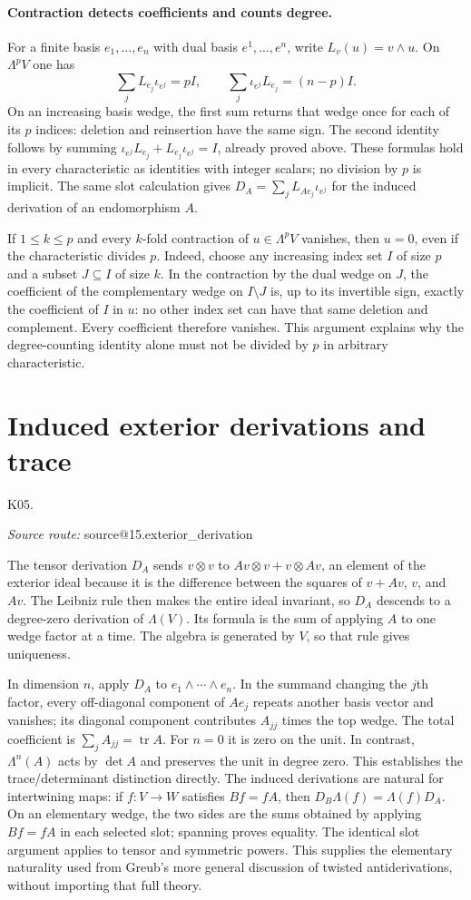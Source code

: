 \documentclass[11pt,a4paper]{book}
\makeatletter
\theoremstyle{definition}\newtheorem{definition}[theorem]{Definition}
\theoremstyle{remark}\newtheorem{remark}[theorem]{Remark}
\DeclareMathOperator{\tr}{tr}\DeclareMathOperator{\Span}{span}
\newcommand{\Kentry}[2]{\section{#2}\label{k:#1}\noindent\textsf{\small K05.\detokenize{#1}}\par
  \begingroup\small\color{black!65}\textit{Source route: }\csname source@#1\endcsname\par\endgroup}
\makeatother
\begin{document}
\paragraph{Contraction detects coefficients and counts degree.}
For a finite basis $e_1,\ldots,e_n$ with dual basis $e^1,\ldots,e^n$, write $L_v(u)=v\wedge u$. On $\Lambda^pV$ one has
\[
 \sum_j L_{e_j}\iota_{e^j}=pI,
 \qquad \sum_j\iota_{e^j}L_{e_j}=(n-p)I.
\]
On an increasing basis wedge, the first sum returns that wedge once for each of its $p$ indices: deletion and reinsertion have the same sign. The second identity follows by summing $\iota_{e^j}L_{e_j}+L_{e_j}\iota_{e^j}=I$, already proved above. These formulas hold in every characteristic as identities with integer scalars; no division by $p$ is implicit. The same slot calculation gives $D_A=\sum_jL_{Ae_j}\iota_{e^j}$ for the induced derivation of an endomorphism $A$.

If $1\le k\le p$ and every $k$-fold contraction of $u\in\Lambda^pV$ vanishes, then $u=0$, even if the characteristic divides $p$. Indeed, choose any increasing index set $I$ of size $p$ and a subset $J\subseteq I$ of size $k$. In the contraction by the dual wedge on $J$, the coefficient of the complementary wedge on $I\setminus J$ is, up to its invertible sign, exactly the coefficient of $I$ in $u$: no other index set can have that same deletion and complement. Every coefficient therefore vanishes. This argument explains why the degree-counting identity alone must not be divided by $p$ in arbitrary characteristic.

\Kentry{15.exterior_derivation}{Induced exterior derivations and trace}
The tensor derivation $D_A$ sends $v\otimes v$ to $Av\otimes v+v\otimes Av$, an element of the exterior ideal because it is the difference between the squares of $v+Av$, $v$, and $Av$. The Leibniz rule then makes the entire ideal invariant, so $D_A$ descends to a degree-zero derivation of $\Lambda(V)$. Its formula is the sum of applying $A$ to one wedge factor at a time. The algebra is generated by $V$, so that rule gives uniqueness.

In dimension $n$, apply $D_A$ to $e_1\wedge\cdots\wedge e_n$. In the summand changing the $j$th factor, every off-diagonal component of $Ae_j$ repeats another basis vector and vanishes; its diagonal component contributes $A_{jj}$ times the top wedge. The total coefficient is $\sum_jA_{jj}=\tr A$. For $n=0$ it is zero on the unit. In contrast, $\Lambda^n(A)$ acts by $\det A$ and preserves the unit in degree zero. This establishes the trace/determinant distinction directly.
The induced derivations are natural for intertwining maps: if $f:V\to W$ satisfies $Bf=fA$, then $D_B\Lambda(f)=\Lambda(f)D_A$. On an elementary wedge, the two sides are the sums obtained by applying $Bf=fA$ in each selected slot; spanning proves equality. The identical slot argument applies to tensor and symmetric powers. This supplies the elementary naturality used from Greub's more general discussion of twisted antiderivations, without importing that full theory.
\end{document}
